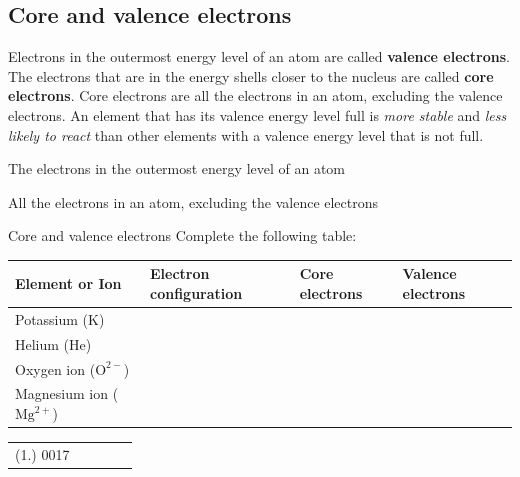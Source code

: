 \subsection*{Core and valence electrons}
            \nopagebreak
        \label{m38741*id259935}Electrons in the outermost energy level of an atom are called \textbf{valence electrons}. The electrons that are in the energy shells closer to the nucleus are called \textbf{core electrons}. Core electrons are all the electrons in an atom, excluding the valence electrons. An element that has its valence energy level full is \textsl{more stable} and \textsl{less likely to react} than other elements with a valence energy level that is not full.\par 

 {  The electrons in the outermost energy level of an atom} 

 { All the electrons in an atom, excluding the valence electrons}
 
\begin{exercises}{Core and valence electrons} \vspace{-1cm}
Complete the following table:
 \begin{center}
  \begin{tabular}{|l|l|l|l|} \hline
   \textbf{Element or Ion} & \textbf{Electron configuration} & \textbf{Core electrons} & \textbf{Valence electrons} \\ \hline
   Potassium ($\text{K}$) & & & \\ \hline
   Helium ($\text{He}$) & & & \\ \hline
   Oxygen ion ($\text{O}^{2-}$) & & & \\ \hline
   Magnesium ion ($\text{Mg}^{2+}$) & & & \\ \hline
  \end{tabular}
 \end{center}
\practiceinfo
\par 
 \par \begin{tabular}[h]{ccccc}
 (1.) 0017  &    &    &   & 
\end{tabular}
\end{exercises}
      
\label{m38741*uid105}

